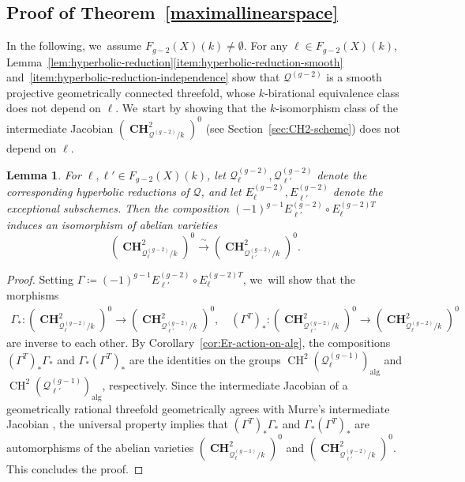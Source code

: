 \documentclass[JEP,XML,SOM,Unicode,NoEqCountersInSection,published]{cedram}
\theoremstyle{plain}
\newtheorem{lem}[thm]{Lemma}
\theoremstyle{definition}
\DeclareMathOperator{\alg}{alg}
\DeclareMathOperator{\CH}{CH}
\DeclareMathOperator{\bCH}{\mathbf{CH}}
\begin{document}
\subsection{Proof of Theorem~\ref{maximallinearspace}}
In the following, we~assume $F_{g-2}(X)(k)\neq \emptyset$.
For any $\ell\in F_{g-2}(X)(k)$, Lemma~\ref{lem:hyperbolic-reduction}\eqref{item:hyperbolic-reduction-smooth} and~\eqref{item:hyperbolic-reduction-independence}
show that $\mathcal{Q}^{(g-2)}$ is a smooth projective geometrically connected threefold,
whose $k$\nobreakdash-birational equivalence class does not depend on $\ell$. We~start by showing that the $k$\nobreakdash-isomorphism class of the intermediate Jacobian
$(\bCH^2_{\mathcal{Q}^{(g-2)}/k})^0$ (see Section~\ref{sec:CH2-scheme}) does not depend on $\ell$.

\begin{lem}\label{lem:ch2-ll'-isom}
For $\ell, \ell'\in F_{g-2}(X)(k)$, let $\mathcal{Q}^{(g-2)}_\ell, \mathcal{Q}^{(g-2)}_{\ell'}$ denote the corresponding hyperbolic reductions of $\mathcal{Q}$,
and let $E^{(g-2)}_{\ell}, E^{(g-2)}_{\ell'}$ denote the exceptional subschemes.
Then the composition $(-1)^{g-1}E^{(g-2)}_{\ell'}\circ E^{(g-2)T}_\ell$
induces an isomorphism of
abelian varieties
\[
(\bCH^2_{\mathcal{Q}^{(g-2)}_\ell/k})^0\xrightarrow{\;\sim\;}(\bCH^2_{\mathcal{Q}^{(g-2)}_{\ell'}/k})^0.
\]
\end{lem}

\begin{proof}
Setting $\Gamma \coloneqq (-1)^{g-1}E^{(g-2)}_{\ell'}\circ E^{(g-2)T}_{\ell}$, we~will show that the morphisms
\begin{align*}
\Gamma_*\colon (\bCH^2_{\mathcal{Q}^{(g-2)}_\ell/k})^0\to (\bCH^2_{\mathcal{Q}^{(g-2)}_{\ell'}/k})^0, \quad (\Gamma^T)_*\colon
(\bCH^2_{\mathcal{Q}^{(g-2)}_{\ell'}/k})^0\to (\bCH^2_{\mathcal{Q}^{(g-2)}_\ell/k})^0
\end{align*}
are inverse to each other.
By Corollary~\ref{cor:Er-action-on-alg},
the compositions $(\Gamma^T)_*\Gamma_*$ and $\Gamma_*(\Gamma^T)_*$ are the identities on the groups
$\CH^2(\mathcal{Q}^{(g-1)}_\ell)_{\alg}$ and $\CH^2(\mathcal{Q}^{(g-1)}_{\ell'})_{\alg}$, respectively.
Since the intermediate Jacobian
of a geometrically rational threefold geometrically agrees with Murre's intermediate Jacobian \cite[Th.\,3.1(vi)]{BW-IJ},
the universal property \cite[\S 1.8]{Murre85} implies that $(\Gamma^T)_*\Gamma_*$ and $\Gamma_*(\Gamma^T)_*$ are automorphisms of the abelian varieties $(\bCH^2_{\mathcal{Q}^{(g-1)}_{\ell}/k})^0$ and $(\bCH^2_{\mathcal{Q}^{(g-2)}_{\ell'}/k})^0$.
This concludes the proof.
\end{proof}
\end{document}
